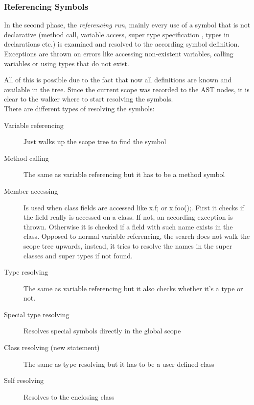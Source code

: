 \subsubsection{Referencing Symbols}
In the second phase, the \emph{referencing run}, mainly every use of a symbol
that is not declarative (method call, variable access, super type specification
, types in declarations etc.) is examined and resolved to the according symbol
definition. Exceptions are thrown on errors like accessing non-existent
variables, calling variables or using types that do not exist.

All of this is possible due to the fact that now all definitions are known
and available in the tree. Since the current scope was recorded to the AST
nodes, it is clear to the walker where to start resolving the symbols.\\

\noindent There are different types of resolving the symbols:
\begin{description}
\item[Variable referencing]
Just walks up the scope tree to find the symbol
\item[Method calling]
The same as variable referencing but it has to be a method symbol
\item[Member accessing]
Is used when class fields are accessed like x.f; or x.foo();. First it checks
if the field really is accessed on a class. If not, an according exception
is thrown. Otherwise it is checked if a field with such name exists
in the class. Opposed to normal variable referencing, the search does not walk
the scope tree upwards, instead, it tries to resolve the names in the super classes
and super types if not found.
\item[Type resolving]
The same as variable referencing but it also checks whether it's a type or not.
\item[Special type resolving]
Resolves special symbols directly in the global scope
\item[Class resolving (new statement)]
The same as type resolving but it has to be a user defined class
\item[Self resolving]
Resolves to the enclosing class
\end{description}

